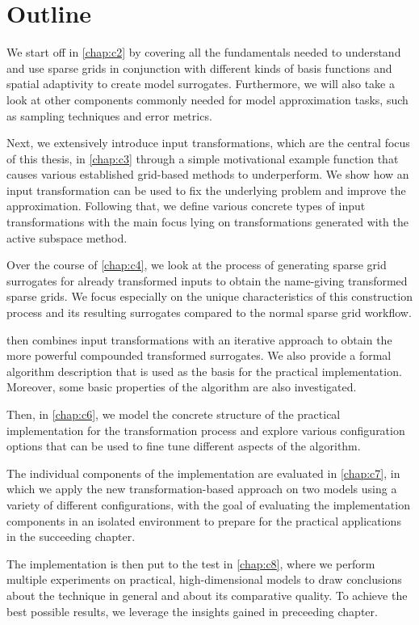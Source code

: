 \documentclass[
  a4paper,  %
  twoside,  %
  bibliography=totoc,
  headsepline,
  cleardoublepage=empty,
  parskip=half,
  draft=false
]{scrbook}
\begin{document}
\section{Outline}

We start off in \cref{chap:c2} by covering all the fundamentals needed to understand and use sparse grids in conjunction with different kinds of basis functions and spatial adaptivity to create model surrogates.
Furthermore, we will also take a look at other components commonly needed for model approximation tasks, such as sampling techniques and error metrics.

Next, we extensively introduce input transformations, which are the central focus of this thesis, in \cref{chap:c3} through a simple motivational example function that causes various established grid-based methods to underperform.
We show how an input transformation can be used to fix the underlying problem and improve the approximation.
Following that, we define various concrete types of input transformations with the main focus lying on transformations generated with the active subspace method.

Over the course of \cref{chap:c4}, we look at the process of generating sparse grid surrogates for already transformed inputs to obtain the name-giving transformed sparse grids.
We focus especially on the unique characteristics of this construction process and its resulting surrogates compared to the normal sparse grid workflow.

 then combines input transformations with an iterative approach to obtain the more powerful compounded transformed surrogates.
We also provide a formal algorithm description that is used as the basis for the practical implementation.
Moreover, some basic properties of the algorithm are also investigated.

Then, in \cref{chap:c6}, we model the concrete structure of the practical implementation for the transformation process and explore various configuration options that can be used to fine tune different aspects of the algorithm.

The individual components of the implementation are evaluated in \cref{chap:c7}, in which we apply the new transformation-based approach on two models using a variety of different configurations, with the goal of evaluating the implementation components in an isolated environment to prepare for the practical applications in the succeeding chapter.

The implementation is then put to the test in \cref{chap:c8}, where we perform multiple experiments on practical, high-dimensional models to draw conclusions about the technique in general and about its comparative quality.
To achieve the best possible results, we leverage the insights gained in preceeding chapter.
\end{document}
